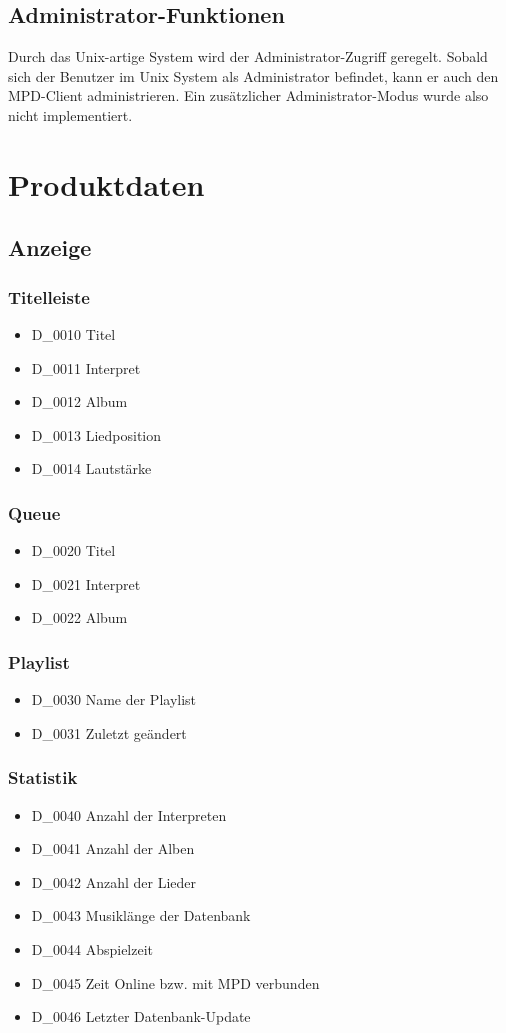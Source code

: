 \subsection{Administrator-Funktionen}
Durch das Unix-artige System wird der Administrator-Zugriff geregelt. Sobald sich der Benutzer im Unix System
als Administrator befindet, kann er auch den MPD-Client administrieren. Ein zusätzlicher Administrator-Modus wurde also
nicht implementiert.
\section{Produktdaten}
\subsection{Anzeige}
\subsubsection{Titelleiste}
\begin{itemize}
	\item D\_0010 Titel
	\item D\_0011 Interpret
	\item D\_0012 Album
	\item D\_0013 Liedposition
	\item D\_0014 Lautstärke
\end{itemize}
\subsubsection{Queue}
\begin{itemize}
	\item D\_0020 Titel
	\item D\_0021 Interpret
	\item D\_0022 Album
\end{itemize}
\subsubsection{Playlist}
\begin{itemize}
	\item D\_0030 Name der Playlist
	\item D\_0031 Zuletzt geändert
\end{itemize}
\subsubsection{Statistik}
\begin{itemize}
        \item D\_0040 Anzahl der Interpreten
        \item D\_0041 Anzahl der Alben
        \item D\_0042 Anzahl der Lieder
        \item D\_0043 Musiklänge der Datenbank
        \item D\_0044 Abspielzeit
        \item D\_0045 Zeit Online bzw. mit MPD verbunden
	\item D\_0046 Letzter Datenbank-Update
\end{itemize}
